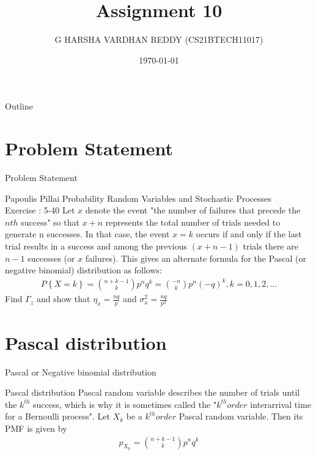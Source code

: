 \documentclass{beamer}
\title{Assignment 10}
\author[CS21BTECH11017]{G HARSHA VARDHAN REDDY (CS21BTECH11017)}
\date{\today}
\providecommand{\cbrak}[1]{\ensuremath{\left\{#1\right\}}}
\begin{document}
\begin{frame}
    \titlepage 
\end{frame}
\logo{}


\begin{frame}{Outline}
    \tableofcontents
\end{frame}




\section{Problem Statement}
\begin{frame}{Problem Statement}

    \begin{block} {Papoulis Pillai Probability Random Variables and Stochastic Processes\\ 
    Exercise : 5-40}  Let $x$ denote the event "the number of failures that precede the $nth$ success" so that $x + n$
represents the total number of trials needed to generate n successes. In that case, the event
${x=k}$ occurs if and only if the last trial results in a success and among the previous
$(x + n -1)$ trials there are $n -1$ successes (or $x$ failures). This gives an alternate formula
for the Pascal (or negative binomial) distribution as follows:
\begin{align}
    P\cbrak{X=k}=\binom{n+k-1}{k}p^n q^k=\binom{-n}{k}p^n (-q)^{k} ,k=0,1,2,\dots \label{1}
\end{align}
Find $\Gamma_z$ and show that $\eta_x=\frac{nq}{p}$ and $\sigma^2_x = \frac{nq}{p^2}$
    \end{block}
\end{frame}
\section{Pascal distribution}
\begin{frame}{Pascal or Negative binomial distribution}
\begin{block}{Pascal distribution}
Pascal random variable describes the number of trials until the $k^{th}$ success, which is why it is sometimes called the "$k^{th} order $ interarrival time for a Bernoulli process". 
Let $X_k$ be a $k^{th} order $ Pascal random variable. Then its PMF is given by
\begin{align}
    p_{X_k}=\binom{n+k-1}{k} p^n q^k \label{2}
\end{align}
\end{block}
\end{frame}
\end{document}
